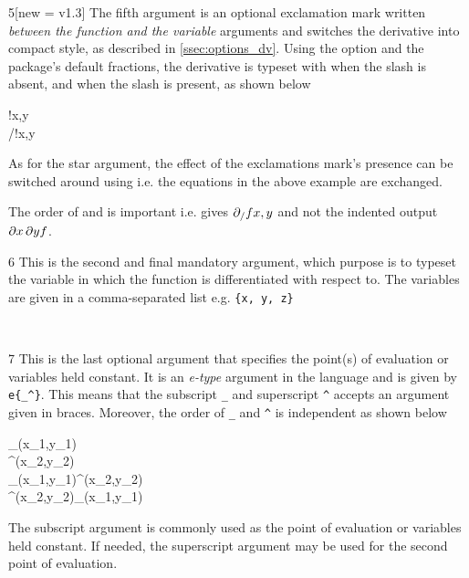 \begin{function}
	\begin{argument}{5}[new = v1.3]
		The fifth argument is an optional exclamation mark written \emph{between the function and the variable} arguments and switches the derivative into compact style, as described in \cref{ssec:options_dv}. Using the option  and the package's default fractions, the derivative is typeset with  when the slash is absent, and  when the slash is present, as shown below
		
		\begin{example}
			!{x,y} \\
			/!{x,y}
		\end{example}
		
		\noindent As for the star argument, the effect of the exclamations mark's presence can be switched around using  i.e. the equations in the above example are exchanged.
		\begin{note}
			The order of \targ{/} and \targ{!} is important i.e. \targ{!}\targ{/} gives $\pdv{f}!/{x,y}$ and not the indented output $\pdv{f}/!{x,y}$.
		\end{note}
	\end{argument}
	
	\begin{argument}{6}
		This is the second and final mandatory argument, which purpose is to typeset the variable in which the function is differentiated with respect to. The variables are given in a comma-separated list e.g. \texttt{\{x, y, z\}}
		
		\begin{example}
			\pdv{f}{x} \\
			\pdv{f}{x,y}
		\end{example}
		
	\end{argument}
	
	\begin{argument}{7}
		This is the last optional argument that specifies the point(s) of evaluation or variables held constant. It is an \emph{e-type} argument in the  language and is given by \verb|e{_^}|. This means that the subscript \verb|_| and superscript \verb|^| accepts an argument given in braces. Moreover, the order of \verb|_| and \verb|^| is independent as shown below
		
		\begin{example}
			_{(x_1,y_1)} \\
			^{(x_2,y_2)} \\
			_{(x_1,y_1)}^{(x_2,y_2)} \\
			^{(x_2,y_2)}_{(x_1,y_1)}
		\end{example}
		
		\noindent The subscript argument is commonly used as the point of evaluation or variables held constant. If needed, the superscript argument may be used for the second point of evaluation.
	\end{argument}
	
\end{function}

